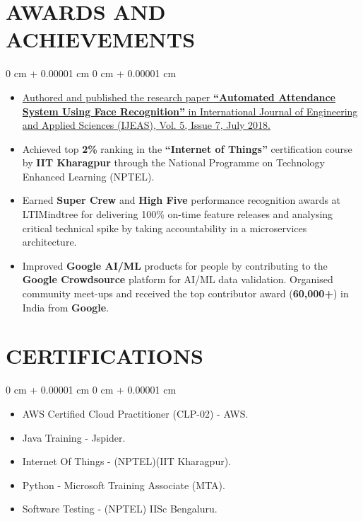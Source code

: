 \documentclass[10pt, letterpaper]{article}
\newenvironment{highlights}{
    \begin{itemize}[
        topsep=0.10 cm,
        parsep=0.10 cm,
        partopsep=0pt,
        itemsep=0pt,
        leftmargin=0 cm + 10pt
    ]
}{
    \end{itemize}
} %
\newenvironment{onecolentry}{
    \begin{adjustwidth}{
        0 cm + 0.00001 cm
    }{
        0 cm + 0.00001 cm
    }
}{
    \end{adjustwidth}
} %
\begin{document}
    
    \vspace{0.1 cm}
    \section{AWARDS AND ACHIEVEMENTS}
    \vspace{0.1 cm}
        \begin{onecolentry}
            \begin{highlights}
                \item \href{https://www.ijeas.org/page/search} {Authored and published the research paper \textbf{“Automated Attendance System Using Face Recognition”} in International Journal of Engineering and Applied Sciences (IJEAS), Vol. 5, Issue 7, July 2018.}
                
                \item {Achieved top \textbf{2\%} ranking in the \textbf{“Internet of Things”} certification course by \textbf{IIT Kharagpur} through the National Programme on Technology Enhanced Learning (NPTEL).}
                
                \item {Earned \textbf{Super Crew} and \textbf{High Five} performance recognition awards at LTIMindtree for delivering 100\% on-time feature releases and analysing critical technical spike by taking accountability in a microservices architecture.}
                
                \item {Improved \textbf{Google AI/ML} products for people by contributing to the \textbf{Google Crowdsource} platform for AI/ML data validation. Organised community meet-ups and received the top contributor award (\textbf{60,000+}) in India from \textbf{Google}.}
            \end{highlights}
        \end{onecolentry}

    \vspace{0.1 cm}
    \section{CERTIFICATIONS}
    \vspace{0.1 cm}
        \begin{onecolentry}
            \begin{highlights}
                \item {AWS Certified Cloud Practitioner (CLP-02) - AWS.}
                \item {Java Training - Jspider.}
                \item {Internet Of Things - (NPTEL)(IIT Kharagpur).}
                \item {Python - Microsoft Training Associate (MTA).}
                \item {Software Testing - (NPTEL) IISc Bengaluru.}
                
            \end{highlights}
        \end{onecolentry}
        
\end{document}
